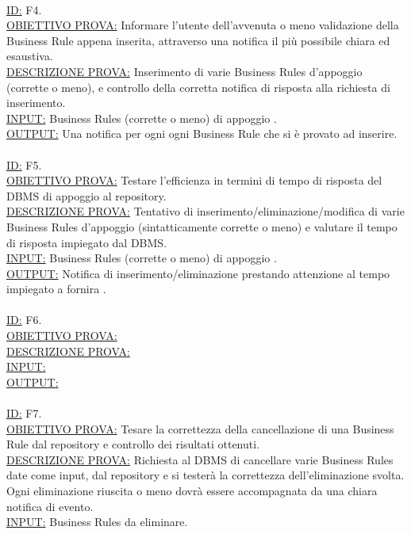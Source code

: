 \documentclass[11pt,titlepage,a4paper]{report}
\begin{document}
\\
\underline{ID:} F4.\\
\underline{OBIETTIVO PROVA:} Informare l'utente dell'avvenuta o meno validazione della Business Rule appena inserita, attraverso una notifica il pi\`u possibile chiara ed esaustiva. \\
\underline{DESCRIZIONE PROVA:} Inserimento di varie Business Rules d'appoggio (corrette o meno), e controllo della corretta notifica di risposta alla richiesta di inserimento.\\
\underline{INPUT:} Business Rules (corrette o meno) di appoggio .\\
\underline{OUTPUT:} Una notifica per ogni ogni Business Rule che si \`e provato ad inserire.\\
\\
\underline{ID:} F5.\\
\underline{OBIETTIVO PROVA:} Testare l'efficienza in termini di tempo di risposta del DBMS di appoggio al repository. \\
\underline{DESCRIZIONE PROVA:} Tentativo di inserimento/eliminazione/modifica di varie Business Rules d'appoggio (sintatticamente corrette o meno) e valutare il tempo di risposta impiegato dal DBMS.\\
\underline{INPUT:} Business Rules (corrette o meno) di appoggio .\\
\underline{OUTPUT:} Notifica di inserimento/eliminazione prestando attenzione al tempo impiegato a fornira .\\
\\
\underline{ID:} F6.\\
\underline{OBIETTIVO PROVA:}  \\
\underline{DESCRIZIONE PROVA:} \\
\underline{INPUT:} \\
\underline{OUTPUT:} \\
\\
\underline{ID:} F7.\\
\underline{OBIETTIVO PROVA:} Tesare la correttezza della cancellazione di una Business Rule dal repository e controllo dei risultati ottenuti. \\
\underline{DESCRIZIONE PROVA:} Richiesta al DBMS di cancellare varie Business Rules date come input, dal repository e si tester\`a la correttezza dell'eliminazione svolta. Ogni eliminazione riuscita o meno dovr\`a essere accompagnata da una chiara notifica di evento.\\
\underline{INPUT:} Business Rules da eliminare.\\
\end{document}
